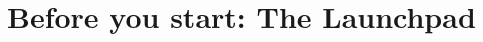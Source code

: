 \documentclass[Orbiter User Manual.tex]{subfiles}
\begin{document}
\section{Before you start: The Launchpad}

\end{document}
